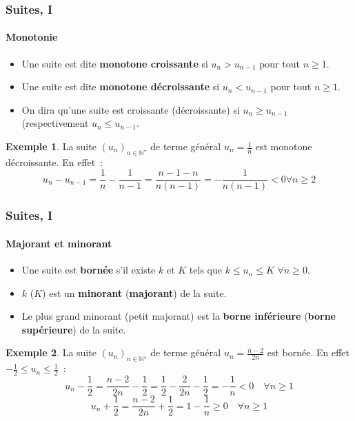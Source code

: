 \documentclass[10pt,notheorems]{beamer}
\theoremstyle{plain}
\theoremstyle{definition} %
\newtheorem{example}{Exemple}
\begin{document}
\begin{frame}
  \frametitle{Suites, I}
  \framesubtitle{Monotonie}
  \hypertarget{slide_suites_3}{}

  \begin{itemize}

  \item Une suite est dite \textbf{monotone croissante} si $u_n>u_{n-1}$ pour tout $n\geq 1$.\newline

  \item Une suite est dite \textbf{monotone décroissante} si $u_n<u_{n-1}$ pour tout $n\geq 1$.\newline

  \item On dira qu'une suite est croissante (décroissante) si $u_n\geq u_{n-1}$ (respectivement $u_n\leq u_{n-1}$.\newline

  \end{itemize}

  \begin{example}
    La suite $(u_n)_{n\in\mathbb N^{\star}}$ de terme général $u_n = \frac{1}{n}$ est monotone décroissante. En effet~:
    \[
      u_n - u_{n-1} = \frac{1}{n}-\frac{1}{n-1} = \frac{n-1-n}{n(n-1)} = -\frac{1}{n(n-1)}<0 \forall n\geq 2
    \]
  \end{example}

\end{frame}


\begin{frame}
  \frametitle{Suites, I}
  \framesubtitle{Majorant et minorant}
  \hypertarget{slide_suites_4}{}

  \begin{itemize}

  \item Une suite est \textbf{bornée} s'il existe $k$ et $K$ tels que $k\leq u_n\leq K$ $\forall n\geq 0$.\newline

  \item $k$ ($K$) est un \textbf{minorant} (\textbf{majorant}) de la suite.\newline

  \item Le plus grand minorant (petit majorant) est la \textbf{borne inférieure} (\textbf{borne supérieure}) de la suite.\newline

  \end{itemize}

  \begin{example}
    La suite $(u_n)_{n\in\mathbb N^{\star}}$ de terme général $u_n = \frac{n-2}{2n}$ est bornée. En effet $-\frac{1}{2}\leq u_n\leq \frac{1}{2}$~:
    \[
      u_n - \frac{1}{2} =  \frac{n-2}{2n}-\frac{1}{2}=\frac{1}{2}-\frac{2}{2n}-\frac{1}{2}=-\frac{1}{n}<0 \quad\forall n\geq 1
    \]
    \[
      u_n+\frac{1}{2} = \frac{n-2}{2n}+\frac{1}{2} = 1 - \frac{1}{n} \geq 0\quad \forall n\geq 1
    \]
  \end{example}

\end{frame}
\end{document}
